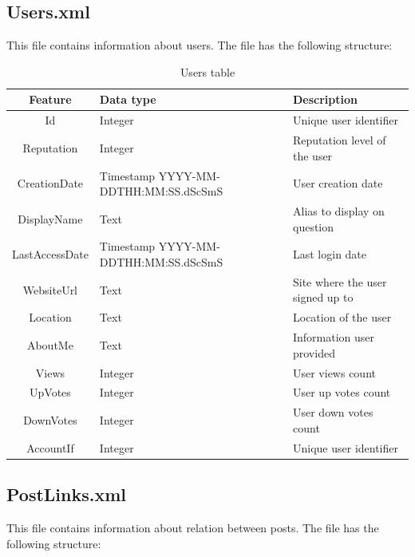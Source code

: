 \documentclass[11pt]{book} %
\begin{document}
    \subsection{Users.xml}

      This file contains information about users. The file has the following structure:

      \begin{table}[!ht]
        \begin{tabular}{|c|p{}|p{}|}
          \hline

          Feature & Data type & Description \\ \hline
          Id & Integer & Unique user identifier \\ \hline
          Reputation & Integer & Reputation level of the user \\ \hline
          CreationDate & Timestamp YYYY-MM-DDTHH:MM:SS.dScSmS & User creation date \\ \hline
          DisplayName & Text & Alias to display on question \\ \hline
          LastAccessDate & Timestamp YYYY-MM-DDTHH:MM:SS.dScSmS & Last login date \\ \hline
          WebsiteUrl & Text & Site where the user signed up to \\ \hline
          Location & Text & Location of the user \\ \hline
          AboutMe & Text & Information user provided \\ \hline
          Views & Integer & User views count \\ \hline
          UpVotes & Integer & User up votes count \\ \hline
          DownVotes & Integer & User down votes count \\ \hline
          AccountIf & Integer & Unique user identifier \\

          \hline
        \end{tabular}
        \caption{Users table}
        \label{tab:users}
      \end{table}

\newpage

    \subsection{PostLinks.xml}

      This file contains information about relation between posts. The file has the following structure:
\end{document}
